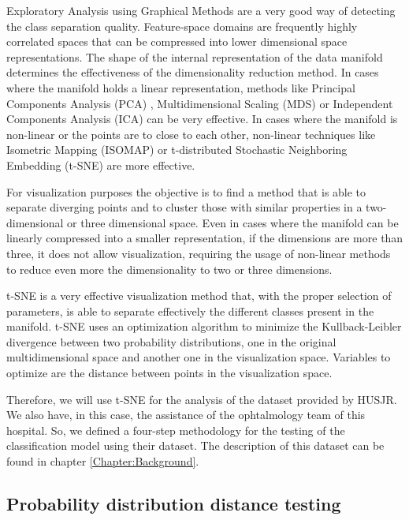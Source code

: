 Exploratory Analysis using Graphical Methods are a very good way of detecting the class separation quality. Feature-space domains are frequently highly correlated spaces that can be compressed into lower dimensional space representations. The shape of the internal representation of the data manifold determines the effectiveness of the dimensionality reduction method. In cases where the manifold holds a linear representation, methods like Principal Components Analysis (PCA) \citep{pearson1901principal}, Multidimensional Scaling (MDS) \citep{kruskal1964multidimensional} or Independent Components Analysis (ICA) \citep{hyvarinen1999fast} can be very effective. In cases where the manifold is non-linear or the points are to close to each other, non-linear techniques like Isometric Mapping (ISOMAP) \citep{tenenbaum2000global} or t-distributed Stochastic Neighboring Embedding (t-SNE) \citep{maaten2008visualizing} are more effective. %

For visualization purposes the objective is to find a method that is able to separate diverging points and to cluster those with similar properties in a two-dimensional or three dimensional space. Even in cases where the manifold can be linearly compressed into a smaller representation, if the dimensions are more than three, it does not allow visualization, requiring the usage of non-linear methods to reduce even more the dimensionality to two or three dimensions. 

t-SNE is a very effective visualization method that, with the proper selection of parameters, is able to separate effectively the different classes present in the manifold. t-SNE uses an optimization algorithm to minimize the Kullback-Leibler divergence \citep{kullback1951information} between two probability distributions, one in the original multidimensional space and another one in the visualization space. Variables to optimize are the distance between points in the visualization space. 

Therefore, we will use t-SNE for the analysis of the dataset provided by HUSJR. We also have, in this case, the assistance of the ophtalmology team of this hospital. So, we defined a four-step methodology for the testing of the classification model using their dataset. The description of this dataset can be found in chapter \ref{Chapter:Background}.


\iffalse %

\subsection{Probability distribution distance testing}

